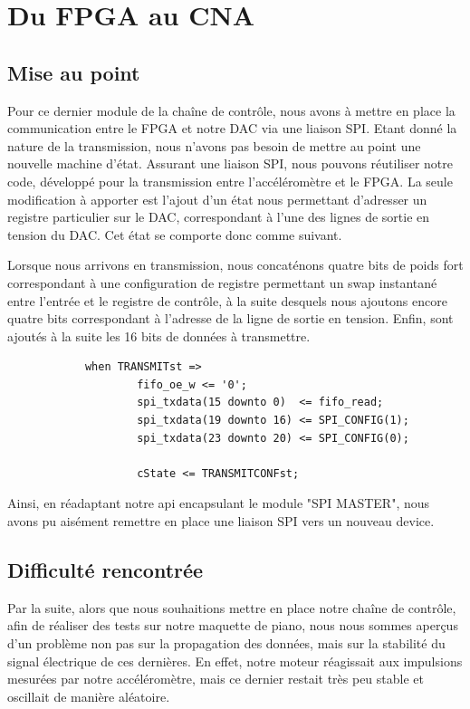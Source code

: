 \documentclass[french,a4paper,12pt]{report}
\begin{document}
	\chapter{Du FPGA au CNA}
	
	\section{Mise au point}
	
	Pour ce dernier module de la chaîne de contrôle, nous avons à mettre en place la communication entre le FPGA et notre DAC via une liaison SPI. Etant donné la nature de la transmission, nous n'avons pas besoin de mettre au point une nouvelle machine d'état. Assurant une liaison SPI, nous pouvons réutiliser notre code, développé pour la transmission entre l'accéléromètre et le FPGA. La seule modification à apporter est l'ajout d'un état nous permettant d'adresser un registre particulier sur le DAC, correspondant à l'une des lignes de sortie en tension du DAC. Cet état se comporte donc comme suivant.
	
	Lorsque nous arrivons en transmission, nous concaténons quatre bits de poids fort correspondant à une configuration de registre permettant un swap instantané entre l'entrée et le registre de contrôle, à la suite desquels nous ajoutons encore quatre bits correspondant à l'adresse de la ligne de sortie en tension. Enfin, sont ajoutés à la suite les 16 bits de données à transmettre.
	
		\begin{lstlisting}
 			when TRANSMITst =>
					fifo_oe_w <= '0';
					spi_txdata(15 downto 0)	 <= fifo_read;
					spi_txdata(19 downto 16) <= SPI_CONFIG(1);
					spi_txdata(23 downto 20) <= SPI_CONFIG(0);
					
					cState <= TRANSMITCONFst;
		\end{lstlisting}
		
		Ainsi, en réadaptant notre api encapsulant le module "SPI MASTER", nous avons pu aisément remettre en place une liaison SPI vers un nouveau device.
		
		\section{Difficulté rencontrée}
		
		Par la suite, alors que nous souhaitions mettre en place notre chaîne de contrôle, afin de réaliser des tests sur notre maquette de piano, nous nous sommes aperçus d'un problème non pas sur la propagation des données, mais sur la stabilité du signal électrique de ces dernières. En effet, notre moteur réagissait aux impulsions mesurées par notre accéléromètre, mais ce dernier restait très peu stable et oscillait de manière aléatoire.
		
\end{document}
